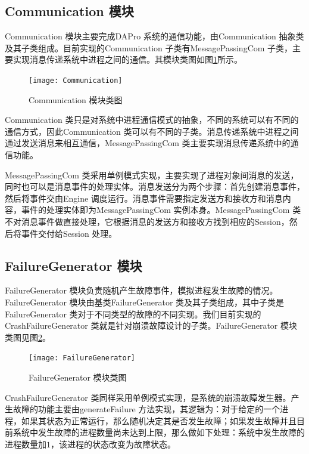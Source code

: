     \subsection{Communication 模块}
    Communication 模块主要完成DAPro 系统的通信功能，由Communication 抽象类及其子类组成。目前实现的Communication 子类有MessagePassingCom 子类，主要实现消息传递系统中进程之间的通信。其模块类图如图\ref{Communication}所示。
    \begin{figure}[ht]
        \centering
        \texttt{[image: Communication]}\\
        \caption{Communication 模块类图}\label{Communication}
    \end{figure}

    Communication 类只是对系统中进程通信模式的抽象，不同的系统可以有不同的通信方式，因此Communication 类可以有不同的子类。消息传递系统中进程之间通过发送消息来相互通信，MessagePassingCom 类主要实现消息传递系统中的通信功能。

    MessagePassingCom 类采用单例模式实现，主要实现了进程对象间消息的发送，同时也可以是消息事件的处理实体。消息发送分为两个步骤：首先创建消息事件，然后将事件交由Engine 调度运行。消息事件需要指定发送方和接收方和消息内容，事件的处理实体即为MessagePassingCom 实例本身。MessagePassingCom 类不对消息事件做直接处理，它根据消息的发送方和接收方找到相应的Session，然后将事件交付给Session 处理。

    \subsection{FailureGenerator 模块}
    FailureGenerator 模块负责随机产生故障事件，模拟进程发生故障的情况。FailureGenerator 模块由基类FailureGenerator 类及其子类组成，其中子类是FailureGenerator 类对于不同类型的故障的不同实现。我们目前实现的CrashFailureGenerator 类就是针对崩溃故障设计的子类。FailureGenerator 模块类图见图\ref{FailureGenerator}。
    \begin{figure}[ht]
        \centering
        \texttt{[image: FailureGenerator]}\\
        \caption{FailureGenerator 模块类图}\label{FailureGenerator}
    \end{figure}

    CrashFailureGenerator 类同样采用单例模式实现，是系统的崩溃故障发生器。产生故障的功能主要由generateFailure 方法实现，其逻辑为：对于给定的一个进程，如果其状态为正常运行，那么随机决定其是否发生故障；如果发生故障并且目前系统中发生故障的进程数量尚未达到上限，那么做如下处理：系统中发生故障的进程数量加$1$，该进程的状态改变为故障状态。

